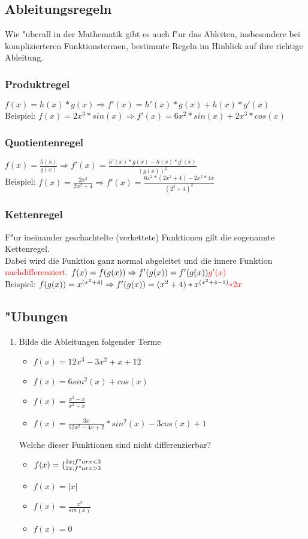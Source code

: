\subsection{Ableitungsregeln}
Wie "uberall in der Mathematik gibt es auch f"ur das Ableiten, insbesondere bei komplizierteren Funktionstermen, bestimmte Regeln im Hinblick auf ihre richtige Ableitung.
\subsubsection{Produktregel}
$f(x)=h(x)*g(x)\Rightarrow f'(x)=h'(x)*g(x)+h(x)*g'(x)$\\
Beispiel: $f(x)=2x^3*sin(x)\Rightarrow f'(x)=6x^2*sin(x)+2x^3*cos(x)$\\
\subsubsection{Quotientenregel}
$f(x)=\frac{h(x)}{g(x)}\Rightarrow f'(x)=\frac{h'(x)*g(x)-h(x)*g'(x)}{(g(x))^2}$\\
Beispiel: $f(x)=\frac{2x^3}{2x^2+4}\Rightarrow f'(x)=\frac{6x^2*(2x^2+4)-2x^3*4x}{(2^2+4)^2}$\\
\subsubsection{Kettenregel}
F"ur ineinander geschachtelte (verkettete) Funktionen gilt die sogenannte Kettenregel.\\
Dabei wird die Funktion ganz normal abgeleitet und die innere Funktion \textcolor{red}{nachdifferenziert}.
$f(x)=f(g(x))\Rightarrow f'(g(x))=f'(g(x))\textcolor{red}{g'(x)}$\\
Beispiel: $f(g(x))=x^{(x^2+4)}\Rightarrow f'(g(x))=(x^2+4)*x^{(x^2+4-1)}\textcolor{red}{*2x}$
\subsection{"Ubungen}
\begin{enumerate}
\item Bilde die Ableitungen folgender Terme
\begin{itemize}
\item $f(x)=12x^3 - 3x^2 + x + 12$
\item $f(x)= 6 sin^2(x) + cos(x) $
\item $f(x)= \frac{x^2-x}{x^2+x}$
\item $f(x)= \frac{3x}{12x^2 - 4x + 2} * sin^2(x) - 3cos(x) + 1$
\end{itemize}
Welche dieser Funktionen sind nicht differenzierbar?
\begin{itemize}
\item $f(x)=\lbrace^{3x; f"ur x < 3}_{2x; f"ur x>3}$
\item $f(x)=|x|$
\item $f(x)= \frac{x^3}{sin(x)}$
\item $f(x)= 0$
\end{itemize}
\end{enumerate}